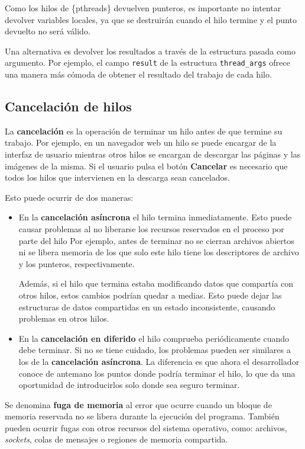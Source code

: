 Como los hilos de \{pthreads\} devuelven punteros, es importante no
intentar devolver variables locales, ya que se destruirán cuando el hilo
termine y el punto devuelto no será válido.

Una alternativa es devolver los resultados a través de la estructura
pasada como argumento. Por ejemplo, el campo \texttt{result} de la
estructura \texttt{thread\_args} ofrece una manera más cómoda de obtener
el resultado del trabajo de cada hilo.

\subsection{Cancelación de hilos}\label{_cancelaciuxf3n_de_hilos}

La \textbf{{}cancelación} es la operación de terminar un hilo antes de
que termine su trabajo. Por ejemplo, en un navegador web un hilo se
puede encargar de la interfaz de usuario mientras otros hilos se
encargan de descargar las páginas y las imágenes de la misma. Si el
usuario pulsa el botón \textbf{Cancelar} es necesario que todos los
hilos que intervienen en la descarga sean cancelados.

Esto puede ocurrir de dos maneras:

\begin{itemize}
\item
  En la \textbf{cancelación asíncrona}{} el hilo termina inmediatamente.
  Esto puede causar problemas al no liberarse los recursos reservados en
  el proceso por parte del hilo Por ejemplo, antes de terminar no se
  cierran archivos abiertos ni se libera memoria de los que solo este
  hilo tiene los descriptores de archivo y los punteros,
  respectivamente.

  Además, si el hilo que termina estaba modificando datos que compartía
  con otros hilos, estos cambios podrían quedar a medias. Esto puede
  dejar las estructuras de datos compartidas en un estado inconsistente,
  causando problemas en otros hilos.
\item
  En la \textbf{cancelación en diferido}{} el hilo comprueba
  periódicamente cuando debe terminar. Si no se tiene cuidado, los
  problemas pueden ser similares a los de la \textbf{cancelación
  asíncrona}. La diferencia es que ahora el desarrollador conoce de
  antemano los puntos donde podría terminar el hilo, lo que da una
  oportunidad de introducirlos solo donde sea seguro terminar.
\end{itemize}

Se denomina \textbf{{}fuga de memoria} al error que ocurre cuando un
bloque de memoria reservada no se libera durante la ejecución del
programa. También pueden ocurrir fugas con otros recursos del sistema
operativo, como: archivos, \emph{sockets}, colas de mensajes o regiones
de memoria compartida.

